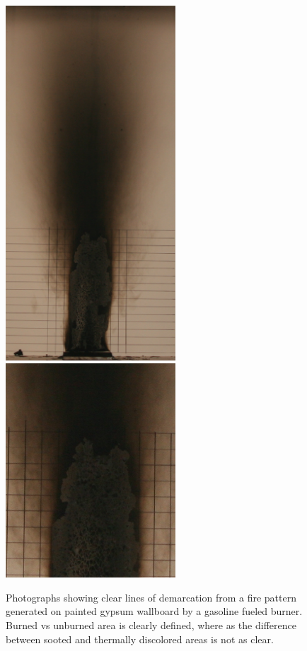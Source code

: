 \documentclass[twoside]{uocthesis}
\begin{document}
\begin{figure}[p]
	\centering
	\includegraphics[width=2.5in]{../Figures/Soot_pattern}
	\includegraphics[width=2.5in]{../Figures/Soot_close}	\\
	\caption[Photographs showing clear lines of demarcation with gasoline]{Photographs showing clear lines of demarcation from a fire pattern generated on painted gypsum wallboard by a gasoline fueled burner.  Burned vs unburned area is clearly defined, where as the difference between sooted and thermally discolored areas is not as clear.}
	\label{Soot_pattern}
\end{figure}
\end{document}
